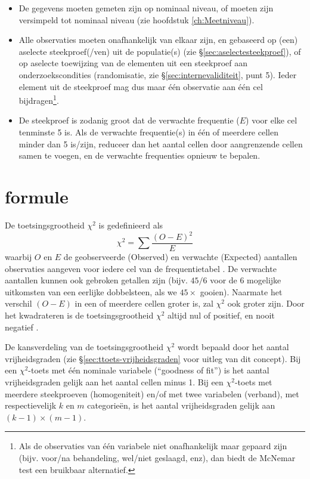 \documentclass[
]{book}
\begin{document}
\begin{itemize}
\item
  De gegevens moeten gemeten zijn op nominaal niveau, of moeten
  zijn versimpeld tot nominaal niveau (zie hoofdstuk \ref{ch:Meetniveau}).
\item
  Alle observaties moeten onafhankelijk van elkaar zijn, en
  gebaseerd op (een) aselecte steekproef(/ven) uit de populatie(s) (zie
  §\ref{sec:aselectesteekproef}), of op aselecte toewijzing van de
  elementen uit een steekproef aan onderzoekscondities (randomisatie, zie §\ref{sec:internevaliditeit}, punt 5). Ieder element uit de steekproef mag dus maar één observatie aan één
  cel bijdragen\footnote{Als de observaties van één variabele niet onafhankelijk maar gepaard zijn (bijv. voor/na behandeling, wel/niet geslaagd, enz), dan biedt de McNemar test een bruikbaar alternatief.}.
\item
  De steekproef is zodanig groot dat de verwachte frequentie
  (\(E\)) voor elke cel tenminste 5 is. Als de verwachte frequentie(s) in
  één of meerdere cellen minder dan 5 is/zijn, reduceer dan het aantal
  cellen door aangrenzende cellen samen te voegen, en de verwachte
  frequenties opnieuw te bepalen.
\end{itemize}

\hypertarget{formule}{%
\section{formule}\label{formule}}

De toetsingsgrootheid \(\chi^2\) is gedefinieerd als
\begin{equation}
  \label{eq:chikwadraat}
    \chi^2 = \sum \frac{(O-E)^2}{E}
\end{equation}
waarbij \(O\) en \(E\) de
geobserveerde (Observed) en verwachte (Expected) aantallen observaties
aangeven voor iedere cel van de frequentietabel \citep{Ferg89}. De verwachte
aantallen kunnen ook gebroken getallen zijn (bijv. \(45/6\) voor de 6
mogelijke uitkomsten van een eerlijke dobbelsteen, als we \(45\times\)
gooien). Naarmate het verschil \((O-E)\) in een of meerdere cellen groter
is, zal \(\chi^2\) ook groter zijn. Door het kwadrateren is de
toetsingsgrootheid \(\chi^2\) altijd nul of positief, en nooit negatief
\citep{Ferg89}.

De kansverdeling van de toetsingsgrootheid \(\chi^2\) wordt bepaald door
het aantal vrijheidsgraden (zie
§\ref{sec:ttoets-vrijheidsgraden} voor uitleg van dit concept).
Bij een \(\chi^2\)-toets met één nominale variabele (``goodness of fit'') is het aantal
vrijheidsgraden gelijk aan het aantal cellen minus 1. Bij een \(\chi^2\)-toets met
meerdere steekproeven (homogeniteit) en/of met twee variabelen
(verband), met respectievelijk \(k\) en \(m\) categorieën, is het aantal
vrijheidsgraden gelijk aan \((k-1)\times(m-1)\).
\end{document}

